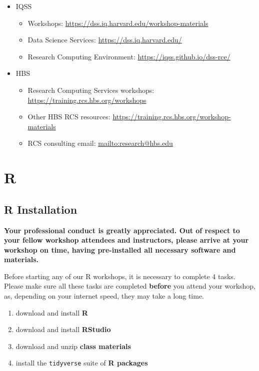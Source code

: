 \documentclass[]{book}
\providecommand{\tightlist}{%
  \setlength{\itemsep}{0pt}\setlength{\parskip}{0pt}}
\begin{document}
\begin{itemize}
\tightlist
\item
  IQSS

  \begin{itemize}
  \tightlist
  \item
    Workshops: \url{https://dss.iq.harvard.edu/workshop-materials}
  \item
    Data Science Services: \url{https://dss.iq.harvard.edu/}
  \item
    Research Computing Environment:
    \url{https://iqss.github.io/dss-rce/}
  \end{itemize}
\item
  HBS

  \begin{itemize}
  \tightlist
  \item
    Research Computing Services workshops:
    \url{https://training.rcs.hbs.org/workshops}
  \item
    Other HBS RCS resources:
    \url{https://training.rcs.hbs.org/workshop-materials}
  \item
    RCS consulting email: \url{mailto:research@hbs.edu}
  \end{itemize}
\end{itemize}

\part{R}\label{part-r}

\chapter{R Installation}\label{r-installation}

\textbf{Your professional conduct is greatly appreciated. Out of respect
to your fellow workshop attendees and instructors, please arrive at your
workshop on time, having pre-installed all necessary software and
materials.}

Before starting any of our R workshops, it is necessary to complete 4
tasks. Please make sure all these tasks are completed \textbf{before}
you attend your workshop, as, depending on your internet speed, they may
take a long time.

\begin{enumerate}
\def\labelenumi{\arabic{enumi}.}
\tightlist
\item
  download and install \textbf{R}
\item
  download and install \textbf{RStudio}
\item
  download and unzip \textbf{class materials}
\item
  install the \texttt{tidyverse} suite of \textbf{R packages}
\end{enumerate}
\end{document}
